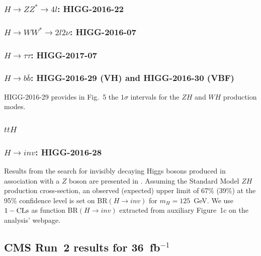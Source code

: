 \subsubsection*{\boldmath $H\to ZZ^*\to 4l$: HIGG-2016-22}


\subsubsection*{\boldmath $H\to WW^*\to 2l2\nu$: HIGG-2016-07}

\subsubsection*{\boldmath $H\to \tau\tau$: HIGG-2017-07}

\subsubsection*{\boldmath $H\to b\bar b$: HIGG-2016-29 (VH) and HIGG-2016-30 (VBF)}

HIGG-2016-29 provides in Fig.~5 the $1\sigma$ intervals for the $ZH$ and $WH$  production modes. 



\subsubsection*{\boldmath $ttH$}

\subsubsection*{\boldmath $H\to inv$: HIGG-2016-28}

Results from the search for invisibly decaying Higgs bosons produced in association with a $Z$ boson are presented in \cite{Aaboud:2017bja}. Assuming the Standard Model $ZH$ production cross-section, an observed (expected) upper limit of 67\% (39\%) at the 95\% confidence level is set on BR$(H\to inv)$ for $m_H= 125$~GeV. We use $1-{\rm CLs}$ as function BR$(H\to inv)$ extracted from auxiliary Figure~1c on the analysis' webpage. 



\subsection{CMS Run~2 results for 36~fb$^{-1}$}

